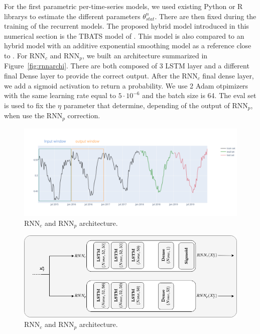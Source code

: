 \documentclass{article} %
\newcommand{\statparam}{\theta_{stat}}
\newcommand{\threshold}{\eta}
\newcommand{\predictor}{\mathrm{RNN}_p}
\newcommand{\classifier}{\mathrm{RNN}_c}
\begin{document}
For the first parametric per-time-series models, we used existing Python or R librarys to estimate the different parameters $\statparam^n$. There are then fixed during the training of the recurrent models. The proposed hybrid model introduced in this numerical section is the TBATS model of \cite{doi:10.1198/jasa.2011.tm09771}. This model is also compared to an hybrid model with an additive exponential smoothing model as a reference close to \cite{smyl2020hybrid}. For $\classifier$ and $\predictor$, we built an architecture summarized in Figure~\ref{fig:rnnarchi}. There are both composed of 3 LSTM layer and a different final Dense layer to provide the correct output. After the $\classifier$ final dense layer, we add a sigmoid activation to return a probability. We use 2 Adam otpimizers with the same learning rate equal to $5\cdot 10^{-6}$ and the batch size is  64. The eval set is used to fix the $\threshold$ parameter that determine, depending of the output of $\predictor$, when use the $\predictor$ correction. 


\begin{figure}
  \centering
    \includegraphics[width=1.\linewidth]{figure/train_eval_test_set}
  \caption{$\classifier$ and $\predictor$ architecture.}
\label{fig:train_eval_test_set}
\end{figure}

\begin{figure}
  \centering
    \includegraphics[width=0.8\linewidth]{figure/rnn_archi}
  \caption{$\classifier$ and $\predictor$ architecture.}
\label{fig:rnn_architecture}
\end{figure}
\end{document}
